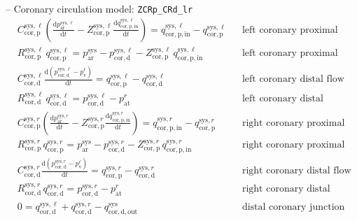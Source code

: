 \documentclass[a4paper,12pt]{report}
\begin{document}
-- Coronary circulation model: \verb"ZCRp_CRd_lr"\\
\begin{align}
&C_{\mathrm{cor,p}}^{\mathrm{sys},\ell} \left(\frac{\mathrm{d}p_{\mathrm{ar}}^{\mathrm{sys},\ell}}{\mathrm{d}t}-Z_{\mathrm{cor,p}}^{\mathrm{sys},\ell}\frac{\mathrm{d}q_{\mathrm{cor,p,in}}^{\mathrm{sys},\ell}}{\mathrm{d}t}\right) = q_{\mathrm{cor,p,in}}^{\mathrm{sys},\ell} - q_{\mathrm{cor,p}}^{\mathrm{sys},\ell} && \text{left coronary proximal flow balance}\nonumber\\
&R_{\mathrm{cor,p}}^{\mathrm{sys},\ell}\,q_{\mathrm{cor,p}}^{\mathrm{sys},\ell}=p_{\mathrm{ar}}^{\mathrm{sys}}-p_{\mathrm{cor,d}}^{\mathrm{sys},\ell} - Z_{\mathrm{cor,p}}^{\mathrm{sys},\ell}\,q_{\mathrm{cor,p,in}}^{\mathrm{sys},\ell} && \text{left coronary proximal momentum}\nonumber\\
&C_{\mathrm{cor,d}}^{\mathrm{sys},\ell} \frac{\mathrm{d}(p_{\mathrm{cor,d}}^{\mathrm{sys},\ell}-p_{\mathrm{v}}^{\ell})}{\mathrm{d}t} = q_{\mathrm{cor,p}}^{\mathrm{sys},\ell} - q_{\mathrm{cor,d}}^{\mathrm{sys},\ell} && \text{left coronary distal flow balance}\nonumber\\
&R_{\mathrm{cor,d}}^{\mathrm{sys},\ell}\,q_{\mathrm{cor,d}}^{\mathrm{sys},\ell}=p_{\mathrm{cor,d}}^{\mathrm{sys},\ell}-p_{\mathrm{at}}^{r} && \text{left coronary distal momentum}\nonumber\\
&C_{\mathrm{cor,p}}^{\mathrm{sys},r} \left(\frac{\mathrm{d}p_{\mathrm{ar}}^{\mathrm{sys},r}}{\mathrm{d}t}-Z_{\mathrm{cor,p}}^{\mathrm{sys},r}\frac{\mathrm{d}q_{\mathrm{cor,p,in}}^{\mathrm{sys},r}}{\mathrm{d}t}\right) = q_{\mathrm{cor,p,in}}^{\mathrm{sys},r} - q_{\mathrm{cor,p}}^{\mathrm{sys},r} && \text{right coronary proximal flow balance}\nonumber\\
&R_{\mathrm{cor,p}}^{\mathrm{sys},r}\,q_{\mathrm{cor,p}}^{\mathrm{sys},r}=p_{\mathrm{ar}}^{\mathrm{sys}}-p_{\mathrm{cor,d}}^{\mathrm{sys},r} - Z_{\mathrm{cor,p}}^{\mathrm{sys},r}\,q_{\mathrm{cor,p,in}}^{\mathrm{sys},r} && \text{right coronary proximal momentum}\nonumber\\
&C_{\mathrm{cor,d}}^{\mathrm{sys},r} \frac{\mathrm{d}(p_{\mathrm{cor,d}}^{\mathrm{sys},r}-p_{\mathrm{v}}^{\ell})}{\mathrm{d}t} = q_{\mathrm{cor,p}}^{\mathrm{sys},r} - q_{\mathrm{cor,d}}^{\mathrm{sys},r} && \text{right coronary distal flow balance}\nonumber\\
&R_{\mathrm{cor,d}}^{\mathrm{sys},r}\,q_{\mathrm{cor,d}}^{\mathrm{sys},r}=p_{\mathrm{cor,d}}^{\mathrm{sys},r}-p_{\mathrm{at}}^{r} && \text{right coronary distal momentum}\nonumber\\
&0=q_{\mathrm{cor,d}}^{\mathrm{sys},\ell}+q_{\mathrm{cor,d}}^{\mathrm{sys},r}-q_{\mathrm{cor,d,out}}^{\mathrm{sys}} && \text{distal coronary junction flow balance}\nonumber
\end{align}
\end{document}
